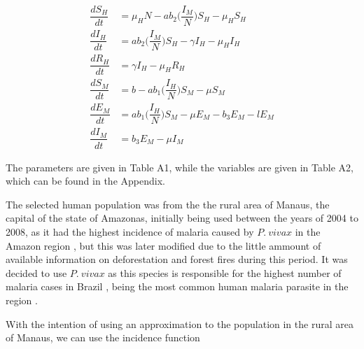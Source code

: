 \documentclass[a4paper,fleqn]{cas-dc}
\begin{document}
\begin{align}
\dfrac{dS_H}{dt} & = \mu_HN-ab_2\bigg(\dfrac{I_M}{N}\bigg)S_H - \mu_HS_H \label{eq1}\\ %
\dfrac{dI_H}{dt} & = ab_2\bigg(\dfrac{I_M}{N}\bigg)S_H-\gamma I_H - \mu_HI_H \label{eq2}\\ %
\dfrac{dR_H}{dt} & = \gamma I_H - \mu_HR_H \label{eq3}\\ %
\dfrac{dS_M}{dt} & = b - ab_1\bigg(\dfrac{I_H}{N}\bigg)S_M - \mu S_M \label{eq4}\\ %
\dfrac{dE_M}{dt} & = ab_1\bigg(\dfrac{I_H}{N}\bigg)S_M - \mu E_M - b_3E_M -lE_M \label{eq5} \\%
\dfrac{dI_M}{dt} & = b_3E_M -\mu I_M  \label{eq6} %
\end{align}

The parameters are given in Table A1, while the variables are given in Table A2, which can be found in the Appendix. 

The selected human population was from the the rural area of Manaus, the capital of the state of Amazonas, initially being used between the years of 2004 to 2008, 
as it had the highest incidence of malaria caused by $P. \ vivax$ in the Amazon region \cite{Rorato2023}, but this was later modified due to the little ammount 
of available information on deforestation and forest fires during this period.
It was decided to use $P. \ vivax$ as this species is responsible for the highest number of malaria cases in Brazil \cite{OliveiraFerreira2010, 10.3389/fpubh.2021.647754}, being the most common human malaria parasite in the region \cite{Vector_Incrimination}. 

With the intention of using an approximation to the population in the rural area of Manaus, we can use the incidence function \cite{Rorato2023}
\end{document}
